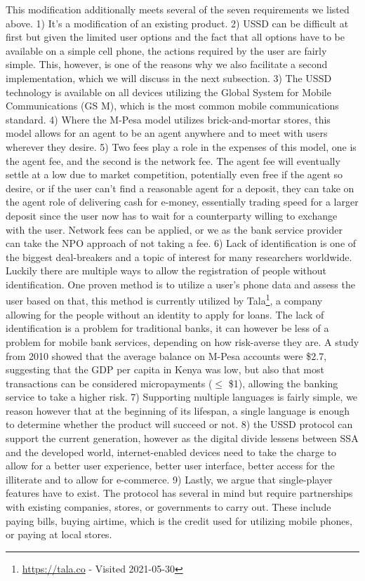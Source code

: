 \documentclass[11pt, a4paper]{article}
\begin{document}
This modification additionally meets several of the seven requirements we listed above.
1) It's a modification of an existing product.
2) USSD can be difficult at first but given the limited user options and the fact that all options have to be available on a simple cell phone, the actions required by the user are fairly simple. This, however, is one of the reasons why we also facilitate a second implementation, which we will discuss in the next subsection.
3) The USSD technology is available on all devices utilizing the Global System for Mobile Communications (GS
M), which is the most common mobile communications standard.
4) Where the M-Pesa model utilizes brick-and-mortar stores, this model allows for an agent to be an agent anywhere and to meet with users wherever they desire.
5) Two fees play a role in the expenses of this model, one is the agent fee, and the second is the network fee. The agent fee will eventually settle at a low due to market competition, potentially even free if the agent so desire, or if the user can't find a reasonable agent for a deposit, they can take on the agent role of delivering cash for e-money, essentially trading speed for a larger deposit since the user now has to wait for a counterparty willing to exchange with the user. Network fees can be applied, or we as the bank service provider can take the NPO approach of not taking a fee.
6) Lack of identification is one of the biggest deal-breakers and a topic of interest for many researchers worldwide. Luckily there are multiple ways to allow the registration of people without identification. One proven method is to utilize a user's phone data and assess the user based on that, this method is currently utilized by Tala\footnote{\url{https://tala.co} - Visited 2021-05-30}, a company allowing for the people without an identity to apply for loans. The lack of identification is a problem for traditional banks, it can however be less of a problem for mobile bank services, depending on how risk-averse they are. A study from 2010 showed that the average balance on M-Pesa accounts were \$2.7\cite{mpesastats}, suggesting that the GDP per capita in Kenya was low, but also that most transactions can be considered micropayments ($\le$ \$1), allowing the banking service to take a higher risk.
7) Supporting multiple languages is fairly simple, we reason however that at the beginning of its lifespan, a single language is enough to determine whether the product will succeed or not.
8) the USSD protocol can support the current generation, however as the digital divide lessens between SSA and the developed world, internet-enabled devices need to take the charge to allow for a better user experience, better user interface, better access for the illiterate and to allow for e-commerce.
9) Lastly, we argue that single-player features have to exist. The protocol has several in mind but require partnerships with existing companies, stores, or governments to carry out. These include paying bills, buying airtime, which is the credit used for utilizing mobile phones, or paying at local stores.
\end{document}
